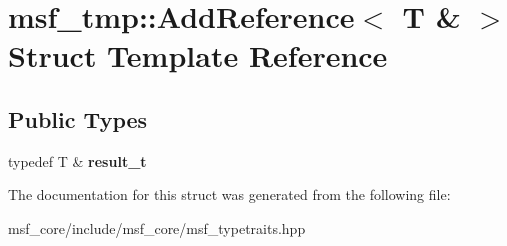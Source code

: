 \hypertarget{structmsf__tmp_1_1AddReference_3_01T_01_6_01_4}{\section{msf\-\_\-tmp\-:\-:Add\-Reference$<$ T \& $>$ Struct Template Reference}
\label{structmsf__tmp_1_1AddReference_3_01T_01_6_01_4}
}
\subsection*{Public Types}
\begin{DoxyCompactItemize}
\item 
\hypertarget{structmsf__tmp_1_1AddReference_3_01T_01_6_01_4_a2caea81992cd408fe490d4d9dac54493}{typedef T \& {\bfseries result\-\_\-t}}\label{structmsf__tmp_1_1AddReference_3_01T_01_6_01_4_a2caea81992cd408fe490d4d9dac54493}

\end{DoxyCompactItemize}


The documentation for this struct was generated from the following file\-:\begin{DoxyCompactItemize}
\item 
msf\-\_\-core/include/msf\-\_\-core/msf\-\_\-typetraits.\-hpp\end{DoxyCompactItemize}
